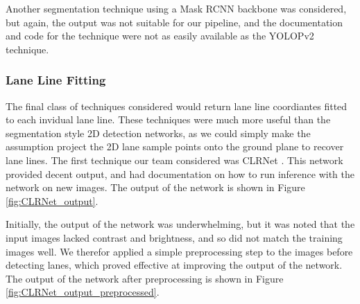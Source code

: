 
Another segmentation technique using a Mask RCNN backbone was considered, but again, the output was not suitable for our pipeline, and the documentation and code for the technique were not as easily available as the YOLOPv2 technique. 


\subsubsection{Lane Line Fitting}
The final class of techniques considered would return lane line coordiantes fitted to each invidual lane line. These techniques were much more useful than the segmentation style 2D detection networks, as we could simply make the assumption project the 2D lane sample points onto the ground plane to recover lane lines. The first technique our team considered was CLRNet \cite{CLRNet}. This network provided decent output, and had documentation on how to run inference with the network on new images. The output of the network is shown in Figure \ref{fig:CLRNet_output}.

Initially, the output of the network was underwhelming, but it was noted that the input images lacked contrast and brightness, and so did not match the training images well. We therefor applied a simple preprocessing step to the images before detecting lanes, which proved effective at improving the output of the network. The output of the network after preprocessing is shown in Figure \ref{fig:CLRNet_output_preprocessed}.

